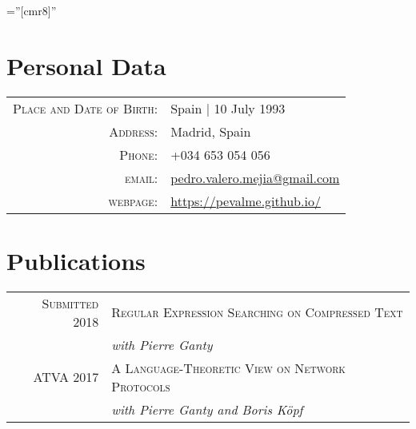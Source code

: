 \documentclass[a4paper,10pt]{article} %
\begin{document}
\pagestyle{empty} %

\font\fb=''[cmr8]'' %


\par{\bigskip\par} %

\section{Personal Data}

\begin{tabular}{rl}
\textsc{Place and Date of Birth:} & Spain  | 10 July 1993 \\
\textsc{Address:} & Madrid, Spain \\
\textsc{Phone:} & +034 653 054 056\\
\textsc{email:} & \href{mailto:pedro.valero.mejia@gmail.com}{pedro.valero.mejia@gmail.com} \\
\textsc{webpage:} & \href{https://pevalme.github.io/}{https://pevalme.github.io/}\\
\end{tabular}


\section{Publications}
\begin{tabular}{rl}
\textsc{Submitted} 2018 & \textsc{Regular Expression Searching on Compressed Text} \\
 & \textit{with Pierre Ganty} \\
\textsc{ATVA} 2017 & \textsc{A Language-Theoretic View on Network Protocols} \\
& \textit{with Pierre Ganty and Boris Köpf} \\
\end{tabular}

\end{document}
